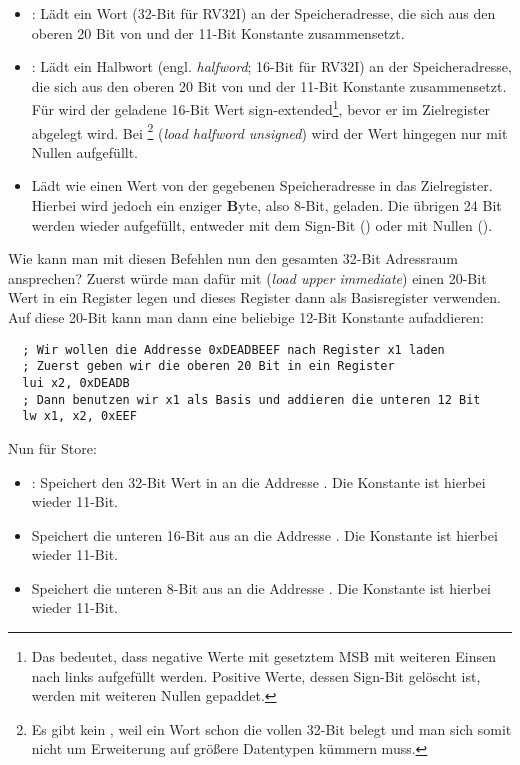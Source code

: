\begin{itemize}
  \item {}: Lädt ein Wort (32-Bit für RV32I) an der
    Speicheradresse, die sich aus den oberen 20 Bit von  und der
    11-Bit Konstante  zusammensetzt.
  \item {}: Lädt ein Halbwort
    (engl. \emph{halfword}; 16-Bit für RV32I) an der Speicheradresse, die sich
    aus den oberen 20 Bit von  und der 11-Bit Konstante
     zusammensetzt. Für  wird der geladene 16-Bit Wert
    sign-extended\footnote{Das bedeutet, dass negative Werte mit gesetztem MSB
      mit weiteren Einsen nach links aufgefüllt werden. Positive Werte, dessen
      Sign-Bit gelöscht ist, werden mit weiteren Nullen gepaddet.}, bevor er im
    Zielregister abgelegt wird. Bei \footnote{Es gibt kein ,
      weil ein Wort schon die vollen 32-Bit belegt und man sich somit nicht um
      Erweiterung auf größere Datentypen kümmern muss.} (\emph{load halfword
      unsigned}) wird der Wert hingegen nur mit Nullen aufgefüllt.
  \item {} Lädt wie  einen Wert von
    der gegebenen Speicheradresse in das Zielregister. Hierbei wird jedoch ein
    enziger \textbf{B}yte, also 8-Bit, geladen. Die übrigen 24 Bit werden wieder
    aufgefüllt, entweder mit dem Sign-Bit () oder mit Nullen
    ().
\end{itemize}

Wie kann man mit diesen Befehlen nun den gesamten 32-Bit Adressraum ansprechen?
Zuerst würde man dafür mit  (\emph{load upper immediate}) einen 20-Bit
Wert in ein Register legen und dieses Register dann als Basisregister
verwenden. Auf diese 20-Bit kann man dann eine beliebige 12-Bit Konstante
aufaddieren:

\begin{lstlisting}
  ; Wir wollen die Addresse 0xDEADBEEF nach Register x1 laden
  ; Zuerst geben wir die oberen 20 Bit in ein Register
  lui x2, 0xDEADB
  ; Dann benutzen wir x1 als Basis und addieren die unteren 12 Bit
  lw x1, x2, 0xEEF
\end{lstlisting}

Nun für Store:

\begin{itemize}
  \item {}: Speichert den 32-Bit Wert in 
    an die Addresse . Die Konstante  ist
    hierbei wieder 11-Bit.
  \item {} Speichert die unteren 16-Bit aus  an die Addresse
    . Die Konstante  ist hierbei wieder
    11-Bit.
  \item {} Speichert die unteren 8-Bit aus  an die Addresse
    . Die Konstante  ist hierbei wieder
    11-Bit.
\end{itemize}

